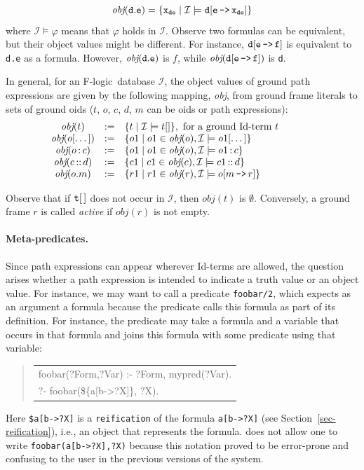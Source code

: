 \documentclass[11pt]{article}
\newcommand{\ERGO}{\mbox{\smaller{\ensuremath{\cal{E}}\smaller{{\sc{RGO}}}}}\xspace}
\newcommand{\FLSYSTEM}{\ERGO}
\newenvironment{qrules}{\begin{quote}\tt\begin{tabular}[t]{l}}%
{\end{tabular}\end{quote}}
\newcommand{\obj}{\textit{obj}\xspace}
\newcommand{\db}[1]{\ensuremath{\mathcal{#1}}}
\newcommand{\isa}{\,{\bf{:}}\,}
\newcommand{\subcl}{\,{\bf{::}}\,}
\newcommand{\mvd}{{\mbox{\tt \,->\,}}}  %
\newcommand{\fl}{\mbox{F-logic}\xspace}
\begin{document}
\begin{displaymath} \tt
\obj(d.e) = \{x_{de} \mid \db I \models d[e\mvd 
x_{de}]\} 
\end{displaymath}
%
where $\db I \models \varphi$ means that $\varphi$ holds in \db I.  Observe
two formulas can be equivalent, but their object values might be different.
For instance, $\tt d[e\mvd f]$ is equivalent to {\tt d.e} as a formula.
However, $\tt \obj(d.e)$ is $f$, while $\tt \obj(d[e\mvd f])$ is {\tt d}.

In general, for an \fl\ database \db I, the object values of ground path
expressions are given by the following mapping, \obj, from ground frame
literals
to sets of ground oids ($t$, $o$, $c$, $d$, $m$ can be oids or path
expressions):
%
\begin{displaymath}
  \begin{array}{cll@{\hspace{4em}}c}
    \obj(t) & := & \{t \mid  \db I\models t[] \}, 
     \textrm{ for a ground Id-term $t$}  \\   
    \obj(o[\dots]) & := & \{o1 \mid o1\in\obj(o), \db I \models o1[\dots]
    \} \\  
    \obj(o\isa c) & := & \{o1 \mid o1\in\obj(o), \db I \models o1\isa c\}
     \\ 
    \obj(c\subcl d) & := & \{c1 \mid c1\in\obj(c), \db I \models c1\subcl
    d\} \\ 
    \obj(o.m) & :=  & \{r1 \mid r1\in\obj(r), \db I \models o[m\mvd
    r]\}  
  \end{array}
\end{displaymath}

Observe that if $\tt t[\,]$ does not occur in \db{I}, then $\obj(t)$ is
$\emptyset$.  Conversely, a ground frame $r$ is called \emph{active} if
$\obj(r)$ is not empty.

\paragraph{Meta-predicates.}
Since path expressions can appear wherever Id-terms are allowed, the
question arises whether a path expression is intended to indicate a truth
value or an object value. For instance, we may want to call a
predicate {\tt foobar/2}, which expects as an argument
a formula because the predicate calls this formula as part of its definition.
For instance, the predicate may take a formula and a variable that occurs
in that formula and joins this formula with some predicate using that
variable:
\begin{qrules}
  foobar(?Form,?Var) :- ?Form, mypred(?Var).\\
  ?- foobar(\$\{a[b->?X]\}, ?X).
\end{qrules}
Here \texttt{\${a[b->?X]}} is a \texttt{reification} of the formula
\texttt{a[b->?X]} (see Section~\ref{sec-reification}), i.e., an object that
represents the formula.  \FLSYSTEM does not allow one to write
\texttt{foobar(a[b->?X],?X)} because this notation proved to be error-prone
and confusing to the user in the previous versions of the system.
\end{document}
